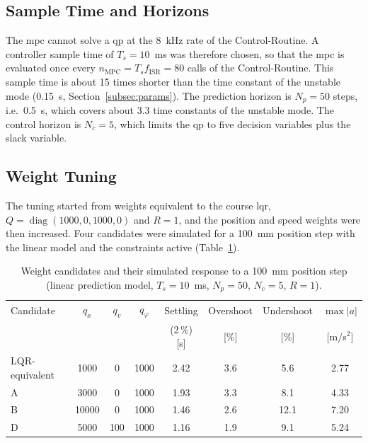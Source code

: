 \subsection{Sample Time and Horizons}
\label{subsec:horizons}

The \ac{mpc} cannot solve a \ac{qp} at the 8~kHz rate of the Control-Routine.
A controller sample time of $T_s = 10$~ms was therefore chosen, so that the
\ac{mpc} is evaluated once every $n_{\mathrm{MPC}} = T_s f_{\mathrm{ISR}} = 80$
calls of the Control-Routine. This sample time is about 15 times shorter than
the time constant of the unstable mode (0.15~s, Section~\ref{subsec:params}).
The prediction horizon is $N_p = 50$ steps, i.e.\ 0.5~s, which covers about
3.3 time constants of the unstable mode. The control horizon is $N_c = 5$,
which limits the \ac{qp} to five decision variables plus the slack variable.

\subsection{Weight Tuning}
\label{subsec:tuning}

The tuning started from weights equivalent to the course \ac{lqr},
$Q = \operatorname{diag}(1000, 0, 1000, 0)$ and $R = 1$, and the position and
speed weights were then increased. Four candidates were simulated for a
100~mm position step with the linear model and the constraints active
(Table~\ref{tab:candidates}).

\begin{table}[ht]
\centering
\caption{Weight candidates and their simulated response to a 100~mm position step (linear prediction model, $T_s = 10$~ms, $N_p = 50$, $N_c = 5$, $R = 1$).}
\label{tab:candidates}
\small
\setlength{\tabcolsep}{4pt}
\begin{tabular}{lccccccc}
\toprule
Candidate & $q_x$ & $q_v$ & $q_\varphi$ & Settling & Overshoot & Undershoot & $\max|a|$ \\
          &       &       &             & (2\,\%) [s] & [\%] & [\%] & [m/s$^2$] \\
\midrule
LQR-equivalent & 1000 & 0 & 1000 & 2.42 & 3.6 & 5.6 & 2.77 \\
A & 3000 & 0 & 1000 & 1.93 & 3.3 & 8.1 & 4.33 \\
B & 10000 & 0 & 1000 & 1.46 & 2.6 & 12.1 & 7.20 \\
D & 5000 & 100 & 1000 & 1.16 & 1.9 & 9.1 & 5.24 \\
\bottomrule
\end{tabular}
\end{table}

